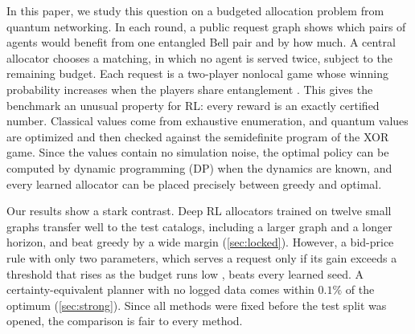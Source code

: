 \documentclass[10pt]{article}
\begin{document}
In this paper, we study this question on a budgeted allocation problem from quantum networking. In each round, a public request graph shows which pairs of agents would benefit from one entangled Bell pair and by how much. A central allocator chooses a matching, in which no agent is served twice, subject to the remaining budget. Each request is a two-player nonlocal game whose winning probability increases when the players share entanglement \citep{bell1964einstein,clauser1969proposed,cleve2004consequences}. This gives the benchmark an unusual property for RL: every reward is an exactly certified number. Classical values come from exhaustive enumeration, and quantum values are optimized and then checked against the semidefinite program of the XOR game. Since the values contain no simulation noise, the optimal policy can be computed by dynamic programming (DP) when the dynamics are known, and every learned allocator can be placed precisely between greedy and optimal.

Our results show a stark contrast. Deep RL allocators trained on twelve small graphs transfer well to the test catalogs, including a larger graph and a longer horizon, and beat greedy by a wide margin (\cref{sec:locked}). However, a bid-price rule with only two parameters, which serves a request only if its gain exceeds a threshold that rises as the budget runs low \citep{gallego1994optimal,adelman2007dynamic}, beats every learned seed. A certainty-equivalent planner with no logged data comes within $0.1\%$ of the optimum (\cref{sec:strong}). Since all methods were fixed before the test split was opened, the comparison is fair to every method.
\end{document}
